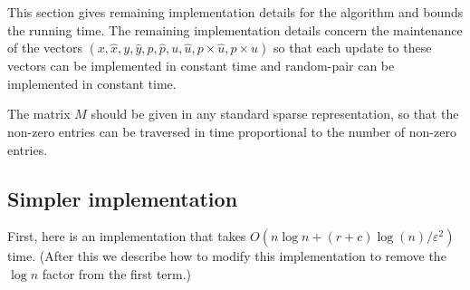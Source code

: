 \documentclass[11pt]{svjour3} \usepackage{fullpage}
\newcommand{\primalOf}[1]{{{#1}}}
\newcommand{\dualOf}[1]{{\hat{#1}}}
\newcommand{\MM}{M}
\newcommand{\xp}{\primalOf x}
\newcommand{\yp}{\primalOf y}
\newcommand{\pp}{\primalOf p}
\newcommand{\wwp}{\primalOf u}
\newcommand{\xd}{\dualOf x}
\newcommand{\yd}{\dualOf y}
\newcommand{\pd}{\dualOf p}
\newcommand{\wwd}{\dualOf u}
\newcommand{\algfont}{}
\newcommand{\eps}{\varepsilon}
\newcommand{\rows}{r}
\newcommand{\columns}{c}
\newcommand{\inputsize}{n}
\begin{document}
This section gives remaining implementation details for the algorithm
and bounds the running time.
The remaining implementation details concern the maintenance of the vectors
$(\xp,\xd,\yp,\yd,\pp,\pd,\wwp,\wwd, \pp\times \wwd, \pd\times\wwp)$
so that each update to these vectors can be implemented in constant time
and {\algfont random-pair} can be implemented in constant time.

The matrix $\MM$ should be given in any standard sparse representation,
so that the non-zero entries can be traversed 
in time proportional to the number of non-zero entries.

\subsection{Simpler implementation}
First, here is an implementation that takes 
$O(\inputsize\log \inputsize + (\rows+\columns)\log(\inputsize)/\eps^2)$ time.
(After this we describe how to modify this implementation
to remove the $\log \inputsize$ factor from the first term.)
\end{document}

